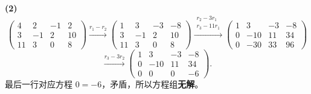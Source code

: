 \documentclass[11pt,a4paper]{ctexart}
\newcommand{\rt}[1]{\xrightarrow{#1}}
\begin{document}
\textbf{(2)}
\[
\left(\begin{array}{ccc|c}4&2&-1&2\\3&-1&2&10\\11&3&0&8\end{array}\right)
\rt{r_1-r_2}
\left(\begin{array}{ccc|c}1&3&-3&-8\\3&-1&2&10\\11&3&0&8\end{array}\right)
\rt{\substack{r_2-3r_1\\ r_3-11r_1}}
\left(\begin{array}{ccc|c}1&3&-3&-8\\0&-10&11&34\\0&-30&33&96\end{array}\right)
\]
\[
\rt{r_3-3r_2}
\left(\begin{array}{ccc|c}1&3&-3&-8\\0&-10&11&34\\0&0&0&-6\end{array}\right).
\]
最后一行对应方程 $0=-6$，矛盾，所以方程组\textbf{无解}。
\end{document}

